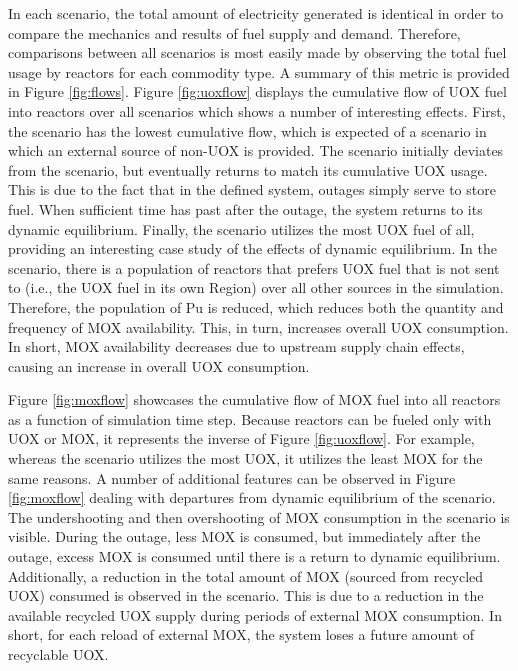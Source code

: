 In each scenario, the total amount of electricity generated is identical in
order to compare the mechanics and results of fuel supply and demand. Therefore,
comparisons between all scenarios is most easily made by observing the total
fuel usage by reactors for each commodity type. A summary of this metric is
provided in Figure \ref{fig:flows}. Figure \ref{fig:uoxflow} displays the
cumulative flow of UOX fuel into reactors over all scenarios which shows a
number of interesting effects. First, the \external scenario has the lowest
cumulative flow, which is expected of a scenario in which an external source of
non-UOX is provided.  The \outage scenario initially deviates from the \basecase
scenario, but eventually returns to match its cumulative UOX usage. This is due
to the fact that in the defined system, outages simply serve to store fuel. When
sufficient time has past after the outage, the system returns to its dynamic
equilibrium. Finally, the \tariff scenario utilizes the most UOX fuel of all,
providing an interesting case study of the effects of dynamic equilibrium. In
the \tariff scenario, there is a population of reactors that prefers UOX fuel
that is not sent to \separations (i.e., the UOX fuel in its own Region) over all
other sources in the simulation. Therefore, the population of Pu is reduced,
which reduces both the quantity and frequency of MOX availability. This, in
turn, increases overall UOX consumption. In short, MOX availability decreases
due to upstream supply chain effects, causing an increase in overall UOX
consumption.

Figure \ref{fig:moxflow} showcases the cumulative flow of MOX fuel into all
reactors as a function of simulation time step. Because reactors can be fueled
only with UOX or MOX, it represents the inverse of Figure \ref{fig:uoxflow}. For
example, whereas the \tariff scenario utilizes the most UOX, it utilizes the
least MOX for the same reasons. A number of additional features can be observed
in Figure \ref{fig:moxflow} dealing with departures from dynamic equilibrium of
the \basecase scenario. The undershooting and then overshooting of MOX
consumption in the \outage scenario is visible. During the outage, less MOX is
consumed, but immediately after the outage, excess MOX is consumed until there
is a return to dynamic equilibrium. Additionally, a reduction in the total
amount of MOX (sourced from recycled UOX) consumed is observed in the \external
scenario. This is due to a reduction in the available recycled UOX supply during
periods of external MOX consumption. In short, for each reload of external MOX,
the system loses a future amount of recyclable UOX.

